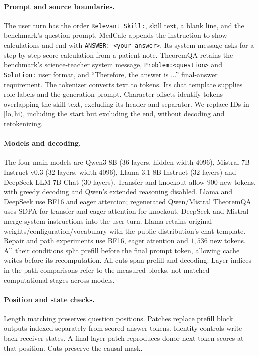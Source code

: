 \paragraph{Prompt and source boundaries.}
The user turn has the order \texttt{Relevant Skill:}, skill text, a blank
line, and the benchmark's question prompt. MedCalc appends the instruction
to show calculations and end with \texttt{ANSWER: <your answer>}.
Its system message asks for a step-by-step score calculation from a patient
note. TheoremQA retains the benchmark's science-teacher system message,
\texttt{Problem:<question>} and \texttt{Solution:} user format, and
``Therefore, the answer is ...'' final-answer requirement.
The tokenizer converts text to tokens. Its chat template supplies role
labels and the generation prompt. Character offsets identify tokens
overlapping the skill text, excluding its header and separator.
We replace IDs in $[\mathrm{lo},\mathrm{hi})$, including the start but
excluding the end, without decoding and retokenizing.

\paragraph{Models and decoding.}
The four main models are Qwen3-8B ($36$ layers, hidden width $4096$),
Mistral-7B-Instruct-v0.3 ($32$ layers, width $4096$),
Llama-3.1-8B-Instruct ($32$ layers) and DeepSeek-LLM-7B-Chat ($30$ layers).
Transfer and knockout allow $900$ new tokens, with greedy decoding and
Qwen's extended reasoning disabled. Llama and DeepSeek use BF16 and eager
attention; regenerated Qwen/Mistral TheoremQA uses SDPA for transfer and
eager attention for knockout. DeepSeek and Mistral merge system instructions
into the user turn. Llama retains original weights/configuration/vocabulary
with the public distribution's chat template.
Repair and path experiments use BF16, eager attention and $1{,}536$ new
tokens. All their conditions split prefill before the final prompt token,
allowing cache writes before its recomputation.
All cuts span prefill and decoding. Layer indices in the path comparisons
refer to the measured blocks, not matched computational stages across models.

\paragraph{Position and state checks.}
Length matching preserves question positions. Patches replace prefill
block outputs indexed separately from scored answer tokens. Identity
controls write back receiver states. A final-layer patch reproduces donor
next-token scores at that position. Cuts preserve the causal mask.

